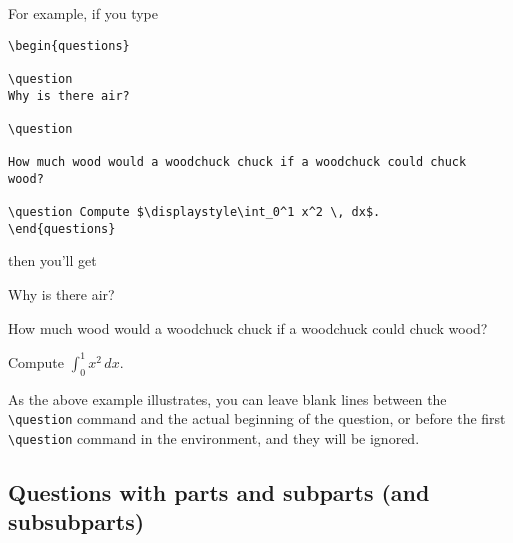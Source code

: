 \documentclass[12pt]{exam}
\begin{document}
For example, if you type
\begin{verbatim}
\begin{questions}

\question
Why is there air?

\question

How much wood would a woodchuck chuck if a woodchuck could chuck
wood?

\question Compute $\displaystyle\int_0^1 x^2 \, dx$.
\end{questions}
\end{verbatim}
then you'll get
\begin{questions}

\question
Why is there air?

\question

How much wood would a woodchuck chuck if a woodchuck could chuck
wood?

\question Compute $\displaystyle\int_0^1 x^2 \, dx$.
\end{questions}

\bigskip

As the above example illustrates, you can leave blank lines
%
 between the \verb"\question" command and the
actual beginning of the question, or before the first \verb"\question"
command in the environment, and they will be ignored.


\subsection{Questions with parts and subparts (and subsubparts)}
\label{sec:parts}
\end{document}
